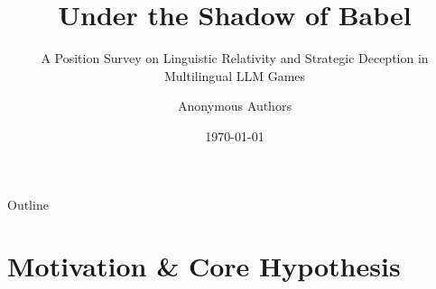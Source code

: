 \documentclass[11pt,aspectratio=169]{beamer}
\title[Under the Shadow of Babel]{Under the Shadow of Babel}
\subtitle{A Position Survey on Linguistic Relativity and Strategic Deception in Multilingual LLM Games}
\author[Anonymous]{Anonymous Authors}
\institute[EMNLP]{Association for Computational Linguistics --- EMNLP 2026}
\date{\today}
\begin{document}
\begin{frame}
    \titlepage
\end{frame}

\begin{frame}{Outline}
    \tableofcontents
\end{frame}

\section{Motivation \& Core Hypothesis}
\end{document}
